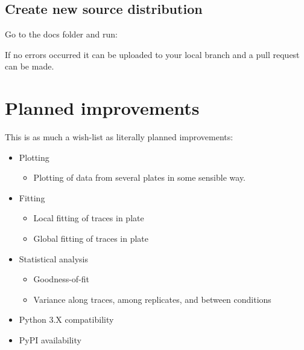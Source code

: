 \documentclass[letterpaper,10pt,english]{sphinxmanual}
\begin{document}
\subsection{Create new source distribution}
\label{\detokenize{contribute:semantic-versioning}}\label{\detokenize{contribute:create-new-source-distribution}}
Go to the docs folder and run:

%
\begin{sphinxVerbatim}[commandchars=\\\{\}]
\end{sphinxVerbatim}

If no errors occurred it can be uploaded to your local branch and
a pull request can be made.


\section{Planned improvements}
\label{\detokenize{contribute:planned-improvements}}
This is as much a wish-list as literally planned improvements:
\begin{itemize}
\item {} 
Plotting
\begin{itemize}
\item {} 
Plotting of data from several plates in some sensible way.

\end{itemize}

\item {} 
Fitting
\begin{itemize}
\item {} 
Local fitting of traces in plate

\item {} 
Global fitting of traces in plate

\end{itemize}

\item {} 
Statistical analysis
\begin{itemize}
\item {} 
Goodness-of-fit

\item {} 
Variance along traces, among replicates, and between conditions

\end{itemize}

\item {} 
Python 3.X compatibility

\item {} 
PyPI availability

\end{itemize}
\end{document}
